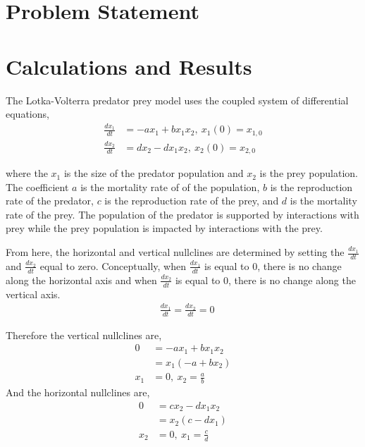 \documentclass[12pt]{article}   %
\theoremstyle{definition}
\numberwithin{equation}{section}
\begin{document}
\section{Problem Statement} \label{APPM2360proj01sec01}




\newpage
\setcounter{page}{5}
\section{Calculations and Results} \label{APPM2360proj01sec01}
The Lotka-Volterra predator prey model uses the coupled system of differential equations,
\begin{align*}
%
\frac{dx_1}{dt} & = -ax_1 + bx_1x_2 ,\ x_1(0) = x_{1,0}\\
%
\frac{dx_2}{dt} & = dx_2 - dx_1x_2 ,\ x_2(0) = x_{2,0}
%
\end{align*}

where the $x_1$ is the size of the predator population and $x_2$ is the prey population. The coefficient $a$ is the mortality rate of of the population, $b$ is the reproduction rate of the predator, $c$ is the reproduction rate of the prey, and $d$ is the mortality rate of the prey. The population of the predator is supported by interactions with prey while the prey population is impacted by interactions with the prey. 

From here, the horizontal and vertical nullclines are determined by setting the $\frac{dx_1}{dt}$ and $\frac{dx_2}{dt}$ equal to zero. Conceptually, when $\frac{dx_1}{dt}$ is equal to 0, there is no change along the horizontal axis and when $\frac{dx_2}{dt}$ is equal to 0, there is no change along the vertical axis. 
\begin{align*}
& \frac{dx_1}{dt} = \frac{dx_2}{dt} = 0
\end{align*}

Therefore the vertical nullclines are,
\begin{align*}
%
0 & =  -ax_1 + bx_1x_2 \\
%  
 & = x_1(-a + bx_2) \\
%
x_1 &= 0, \ x_2 = \frac{a}{b}  
%
\end{align*}
And the horizontal nullclines are, 
\begin{align*}
%
0 & = cx_2 - dx_1x_2 \\  
%
& =  x_2(c - dx_1) \\
%
x_2 &= 0, \ x_1 = \frac{c}{d} 
\end{align*}
\end{document}
